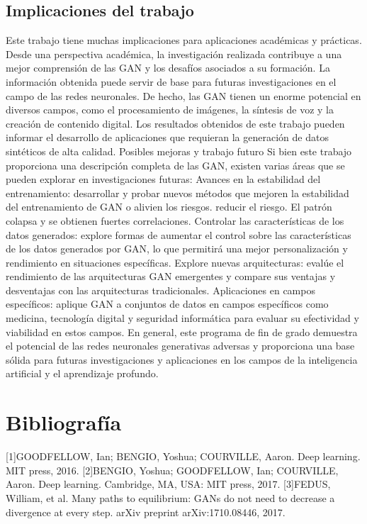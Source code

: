 \subsection{Implicaciones del trabajo}
Este trabajo tiene muchas implicaciones para aplicaciones académicas y prácticas. Desde una perspectiva académica, la investigación realizada contribuye a una mejor comprensión de las GAN y los desafíos asociados a su formación. La información obtenida puede servir de base para futuras investigaciones en el campo de las redes neuronales. De hecho, las GAN tienen un enorme potencial en diversos campos, como el procesamiento de imágenes, la síntesis de voz y la creación de contenido digital. Los resultados obtenidos de este trabajo pueden informar el desarrollo de aplicaciones que requieran la generación de datos sintéticos de alta calidad. Posibles mejoras y trabajo futuro Si bien este trabajo proporciona una descripción completa de las GAN, existen varias áreas que se pueden explorar en investigaciones futuras: Avances en la estabilidad del entrenamiento: desarrollar y probar nuevos métodos que mejoren la estabilidad del entrenamiento de GAN o alivien los riesgos. reducir el riesgo. El patrón colapsa y se obtienen fuertes correlaciones. Controlar las características de los datos generados: explore formas de aumentar el control sobre las características de los datos generados por GAN, lo que permitirá una mejor personalización y rendimiento en situaciones específicas. Explore nuevas arquitecturas: evalúe el rendimiento de las arquitecturas GAN emergentes y compare sus ventajas y desventajas con las arquitecturas tradicionales. Aplicaciones en campos específicos: aplique GAN a conjuntos de datos en campos específicos como medicina, tecnología digital y seguridad informática para evaluar su efectividad y viabilidad en estos campos. En general, este programa de fin de grado demuestra el potencial de las redes neuronales generativas adversas y proporciona una base sólida para futuras investigaciones y aplicaciones en los campos de la inteligencia artificial y el aprendizaje profundo.
\newpage
\thispagestyle{empty} %
\mbox{} %
\section{Bibliografía}\label{sec:bibliografia}
[1]GOODFELLOW, Ian; BENGIO, Yoshua; COURVILLE, Aaron. Deep learning. MIT press, 2016.
[2]BENGIO, Yoshua; GOODFELLOW, Ian; COURVILLE, Aaron. Deep learning. Cambridge, MA, USA: MIT press, 2017.
[3]FEDUS, William, et al. Many paths to equilibrium: GANs do not need to decrease a divergence at every step. arXiv preprint arXiv:1710.08446, 2017.

